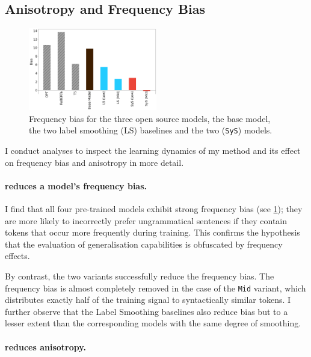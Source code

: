 \subsection{Anisotropy and Frequency Bias}

\begin{figure}
    \centering
    \includegraphics[width=0.5\textwidth]{chapters/syntatic-smoothing/figures/biases.png}
    \caption{Frequency bias for the three open source models, the base model, the two label smoothing (LS) baselines and the two \smoothing (\texttt{SyS}) models.}
    \label{fig:biases}
\end{figure}

I conduct analyses to inspect the learning dynamics of my method and its effect on frequency bias and anisotropy in more detail. 

\paragraph{\smoothing reduces a model's frequency bias.}
I find that all four pre-trained models exhibit strong frequency bias (see \cref{fig:biases}); they are more likely to incorrectly prefer ungrammatical sentences if they contain tokens that occur more frequently during training. This confirms the hypothesis that the evaluation of generalisation capabilities is obfuscated by frequency effects. 

By contrast, the two \smoothing variants successfully reduce the frequency bias. The frequency bias is almost completely removed in the case of the \texttt{Mid} variant, which distributes exactly half of the training signal to syntactically similar tokens. I further observe that the Label Smoothing baselines also reduce bias but to a lesser extent than the corresponding \smoothing models with the same degree of smoothing. 


\paragraph{\smoothing reduces anisotropy.}

